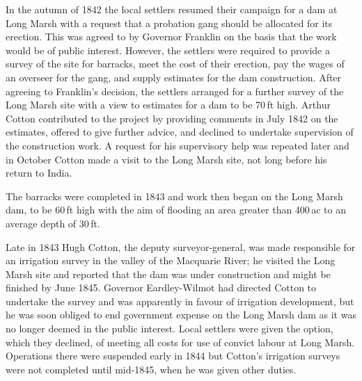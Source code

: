 In the autumn of 1842 the local settlers resumed their campaign for a
dam at Long Marsh with a request that a probation gang should be
allocated for its erection.  This was agreed to by Governor Franklin
on the basis that the work would be of public interest.  However, the settlers were
required to provide a survey of the site for barracks, meet the cost
of their erection, pay the wages of an overseer for the gang, and
supply estimates for the dam construction.  After agreeing to
Franklin's decision, the settlers arranged for a further survey of the
Long Marsh site with a view to estimates for a dam to be 70\,ft high.
Arthur Cotton contributed to the project by providing comments in July
1842 on the estimates, offered to give further advice, and declined to
undertake supervision of the construction work.  A request for his
supervisory help was repeated later and in October Cotton made a visit
to the Long Marsh site, not long before his return to
India.

The barracks were completed in 1843 and work then began on the Long
Marsh dam, to be 60\,ft high with the aim of flooding an area greater
than 400\,ac to an average depth of
30\,ft.

Late in 1843 Hugh Cotton, the deputy surveyor-general, was made
responsible for an irrigation survey in the valley of the Macquarie
River; he visited the Long Marsh site and reported that the dam was
under construction and might be finished by June 1845.  Governor
Eardley-Wilmot had directed Cotton to undertake the survey and was
apparently in favour of irrigation development, but he was soon
obliged to end government expense on the Long Marsh dam as it was no
longer deemed in the public interest.  Local settlers were given the
option, which they declined, of meeting all costs for use of convict
labour at Long Marsh.  Operations there were suspended early in 1844
but Cotton's irrigation surveys were not completed until mid-1845,
when he was given other duties.

